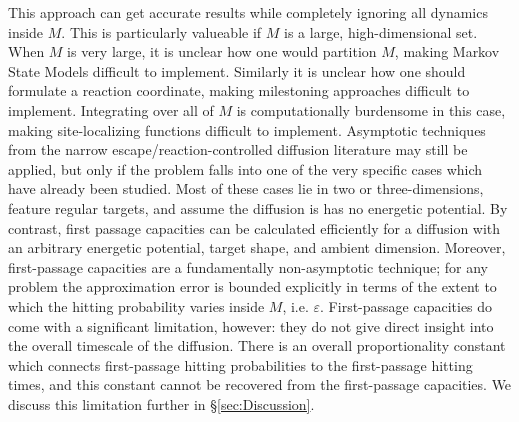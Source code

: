 \documentclass[12pt, nofootinbib,english, amsmath, amssymb, aps, priprint, graphicx,floatfix]{revtex4-1}
\theoremstyle{plain}
\theoremstyle{definition}
\theoremstyle{plain}
\begin{document}
This approach can get accurate results while completely ignoring all dynamics inside $M$.  This is particularly valueable if $M$ is a large, high-dimensional set.  When $M$ is very large, it is unclear how one would partition $M$, making Markov State Models difficult to implement.  Similarly it is unclear how one should formulate a reaction coordinate, making milestoning approaches difficult to implement.  Integrating over all of $M$ is computationally burdensome in this case, making site-localizing functions difficult to implement.  Asymptotic techniques from the narrow escape/reaction-controlled diffusion literature may still be applied, but only if the problem falls into one of the very specific cases which have already been studied.  Most of these cases lie in two or three-dimensions, feature regular targets, and assume the diffusion is has no energetic potential.  By contrast, first passage capacities can be calculated efficiently for a diffusion with an arbitrary energetic potential, target shape, and ambient dimension.  Moreover, first-passage capacities are a fundamentally non-asymptotic technique; for any problem the approximation error is bounded explicitly in terms of the extent to which the hitting probability varies inside $M$, i.e. $\varepsilon$.   First-passage capacities do come with a significant limitation, however: they do not give direct insight into the overall timescale of the diffusion. There is an overall proportionality constant which connects first-passage hitting probabilities to the first-passage hitting times, and this constant cannot be recovered from the first-passage capacities.  We discuss this limitation further in \S\ref{sec:Discussion}.  
\end{document}
